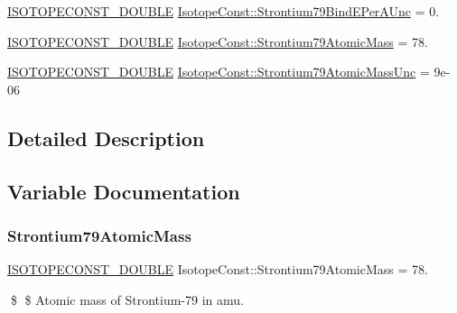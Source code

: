 \begin{DoxyCompactItemize}
\mbox{\hyperlink{group___isotope_const-_macros_ga8f45a7272ce02c0b4c65c44636ed719a}{I\+S\+O\+T\+O\+P\+E\+C\+O\+N\+S\+T\+\_\+\+D\+O\+U\+B\+LE}} \mbox{\hyperlink{group___isotope_const-_strontium-_sr79_gad98604255350994b7b3c6cb7ea84a814}{Isotope\+Const\+::\+Strontium79\+Bind\+E\+Per\+A\+Unc}} = 0.
\item 
\mbox{\hyperlink{group___isotope_const-_macros_ga8f45a7272ce02c0b4c65c44636ed719a}{I\+S\+O\+T\+O\+P\+E\+C\+O\+N\+S\+T\+\_\+\+D\+O\+U\+B\+LE}} \mbox{\hyperlink{group___isotope_const-_strontium-_sr79_ga74a99e23895a8a9719978bd9952bf7a0}{Isotope\+Const\+::\+Strontium79\+Atomic\+Mass}} = 78.
\item 
\mbox{\hyperlink{group___isotope_const-_macros_ga8f45a7272ce02c0b4c65c44636ed719a}{I\+S\+O\+T\+O\+P\+E\+C\+O\+N\+S\+T\+\_\+\+D\+O\+U\+B\+LE}} \mbox{\hyperlink{group___isotope_const-_strontium-_sr79_ga4b34e7ff90dfb1a7ce97a834572cf372}{Isotope\+Const\+::\+Strontium79\+Atomic\+Mass\+Unc}} = 9e-\/06
\end{DoxyCompactItemize}


\subsection{Detailed Description}


\subsection{Variable Documentation}
\mbox{\label{group___isotope_const-_strontium-_sr79_ga74a99e23895a8a9719978bd9952bf7a0}} 
\subsubsection{\texorpdfstring{Strontium79\+Atomic\+Mass}{Strontium79AtomicMass}}
{\footnotesize\ttfamily \mbox{\hyperlink{group___isotope_const-_macros_ga8f45a7272ce02c0b4c65c44636ed719a}{I\+S\+O\+T\+O\+P\+E\+C\+O\+N\+S\+T\+\_\+\+D\+O\+U\+B\+LE}} Isotope\+Const\+::\+Strontium79\+Atomic\+Mass = 78.}

\$ \$ Atomic mass of Strontium-\/79 in amu. \mbox{\label{group___isotope_const-_strontium-_sr79_ga4b34e7ff90dfb1a7ce97a834572cf372}} 
